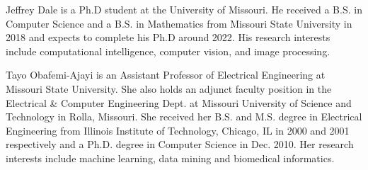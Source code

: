 

\begin{IEEEbiography}{Jeffrey Dale}
    is a Ph.D student at the University of Missouri. He received a B.S. in Computer Science and a B.S. in Mathematics from Missouri State University in 2018 and expects to complete his Ph.D around 2022. His research interests include computational intelligence, computer vision, and image processing.
\end{IEEEbiography}
\vspace{-3em}
\begin{IEEEbiography}{Tayo Obafemi-Ajayi}
is an Assistant Professor of Electrical Engineering at Missouri State University. She also holds an adjunct faculty position in the Electrical \& Computer Engineering Dept. at Missouri University of Science and Technology in Rolla, Missouri. She received her B.S. and M.S. degree in Electrical Engineering from Illinois Institute of Technology, Chicago, IL in 2000 and 2001 respectively and a Ph.D. degree in Computer Science in Dec. 2010.  Her research
interests include machine learning, data mining and biomedical informatics.
\end{IEEEbiography}
